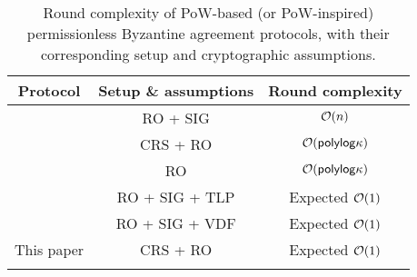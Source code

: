\begin{table*}[ht]
    \begin{tabularx}{\linewidth}{@{\hskip .25in} c @{\hskip .5in}  c @{\hskip .5in} c @{\hskip .25in}}
        \toprule
        \textbf{Protocol}
         & \textbf{Setup \& assumptions }
         & \textbf{Round complexity}
        \\ \midrule
        \cite{C:AndDzi15}
         & RO + SIG
         & $\mathcal{O}(n)$
        \\ \midrule
        \cite{EC:GarKiaLeo15}
         & CRS + RO
         & $\mathcal{O}(\mathsf{polylog} \kappa)$
        \\ \midrule
        \cite{PKC:GKLP18}
         & RO
         & $\mathcal{O}(\mathsf{polylog} \kappa)$
        \\ \midrule
        \cite{EPRINT:EckFauLos17}
         & RO + SIG + TLP
         & Expected $\mathcal{O}(1)$
        \\ \midrule
        \cite{EPRINT:DEFLM22}
         & RO + SIG + VDF
         & Expected $\mathcal{O}(1)$
        \\ \midrule
        This paper
         & CRS + RO
         & Expected $\mathcal{O}(1)$
        \\ \bottomrule
        \caption{Round complexity of PoW-based (or PoW-inspired) permissionless Byzantine agreement protocols, with their corresponding setup and cryptographic assumptions.}
        \label{table:PoW-BA}
    \end{tabularx}
\end{table*}
